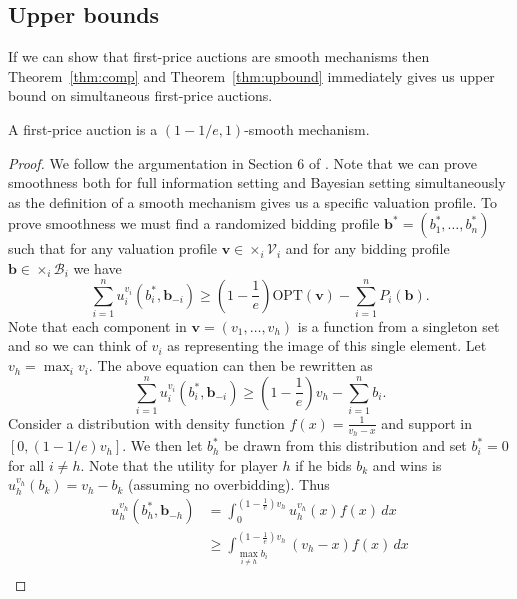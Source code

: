 \subsection{Upper bounds} %
\label{Upper bounds}
If we can show that first-price auctions are smooth mechanisms then Theorem~\ref{thm:comp} and Theorem~\ref{thm:upbound} immediately gives us upper bound on simultaneous first-price auctions.
\begin{proposition}
  A first-price auction is a $ (1- 1 /e, 1) $-smooth mechanism.
\end{proposition}
\begin{proof}
  We follow the argumentation in Section 6 of \cite{Syrgkanis2013Composable}. Note that we can prove smoothness both for full information setting and Bayesian setting simultaneously as the definition of a smooth mechanism gives us a specific valuation profile. To prove smoothness we must find a randomized bidding profile $ \mathbf{b}^{*}= (b_1^{*}, \ldots, b_n^{*}) $ such that for any valuation profile $ \mathbf{v} \in \times_i\mathcal{V}_i $ and for any bidding profile $ \mathbf{b} \in \times_i \mathcal{B}_i $ we have
  \begin{equation}
    \sum_{i = 1}^{n} u_i^{v_i}(b^*_i, \mathbf{b}_{-i}) \geq \left(1 - \frac{1}{e}\right) \text{OPT}(\mathbf{v}) - \sum_{i = 1}^{n} P_i(\mathbf{b}).
  \end{equation}
  Note that each component in $ \mathbf{v} = (v_1, \ldots, v_h) $ is a function from a singleton set and so we can think of $ v_i $ as representing the image of this single element. Let $ v_h = \max_i v_i $. The above equation can then be rewritten as
  \begin{equation}
    \sum_{i = 1}^{n} u_i^{v_i}(b^*_i, \mathbf{b}_{-i}) \geq \left(1 - \frac{1}{e}\right) v_h - \sum_{i = 1}^{n} b_i.
  \end{equation}
  Consider a distribution with density function $ f(x) = \frac{1}{v_h - x} $ and support in $ [0, (1-1 /e)v_h] $. We then let $ b_h^* $ be drawn from this distribution and set $ b_i^* = 0 $ for all $ i \neq h $. Note that the utility for player $ h $ if he bids $ b_k $ and wins is $ u_h^{v_h}(b_k) = v_h - b_k $ (assuming no overbidding). Thus
  \begin{align*}
    u_h^{v_h}(b_h^{*}, \mathbf{b}_{-h}) &= \int_{0}^{\left( 1 - \frac{1}{e} \right)v_h} u_h^{v_h}(x) f(x) \, dx \\
                               &\geq \int_{\max_{i \neq h} b_i}^{\left( 1 - \frac{1}{e} \right)v_h} (v_h - x) f(x) \, dx \\

\end{align*}
\end{proof}
